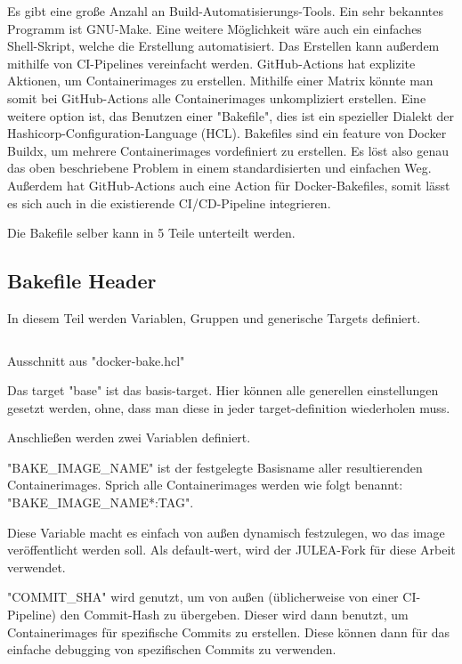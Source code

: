 Es gibt eine große Anzahl an Build-Automatisierungs-Tools. Ein sehr bekanntes Programm ist GNU-Make. Eine weitere Möglichkeit wäre auch ein einfaches Shell-Skript, welche die Erstellung automatisiert. Das Erstellen kann außerdem mithilfe von CI-Pipelines vereinfacht werden. GitHub-Actions hat explizite Aktionen, um Containerimages zu erstellen. Mithilfe einer Matrix könnte man somit bei GitHub-Actions alle Containerimages unkompliziert erstellen. Eine weitere option ist, das Benutzen einer "Bakefile", dies ist ein spezieller Dialekt der Hashicorp-Configuration-Language (HCL). Bakefiles sind ein feature von Docker Buildx, um mehrere Containerimages vordefiniert zu erstellen. Es löst also genau das oben beschriebene Problem in einem standardisierten und einfachen Weg. Außerdem hat GitHub-Actions auch eine Action für Docker-Bakefiles, somit lässt es sich auch in die existierende CI/CD-Pipeline integrieren. 

Die Bakefile selber kann in 5 Teile unterteilt werden.

\subsection{Bakefile Header}

In diesem Teil werden Variablen, Gruppen und generische Targets definiert.

\begin{listing}[H]
    \inputminted[firstline=1,lastline=7]{./lexers/docker-bake-lexer.py}{./code-examples/docker-bake.hcl}
    \caption{Ausschnitt aus "docker-bake.hcl"}
\end{listing}

Das target "base" ist das basis-target. Hier können alle generellen einstellungen gesetzt werden, ohne, dass man diese in jeder target-definition wiederholen muss. 

Anschließen werden zwei Variablen definiert. 

"BAKE\_IMAGE\_NAME" ist der festgelegte Basisname aller resultierenden Containerimages. Sprich alle Containerimages werden wie folgt benannt: "BAKE\_IMAGE\_NAME*:TAG".

Diese Variable macht es einfach von außen dynamisch festzulegen, wo das image veröffentlicht werden soll. Als default-wert, wird der JULEA-Fork für diese Arbeit verwendet.

"COMMIT\_SHA" wird genutzt, um von außen (üblicherweise von einer CI-Pipeline) den Commit-Hash zu übergeben. Dieser wird dann benutzt, um Containerimages für spezifische Commits zu erstellen. Diese können dann für das einfache debugging von spezifischen Commits zu verwenden.

